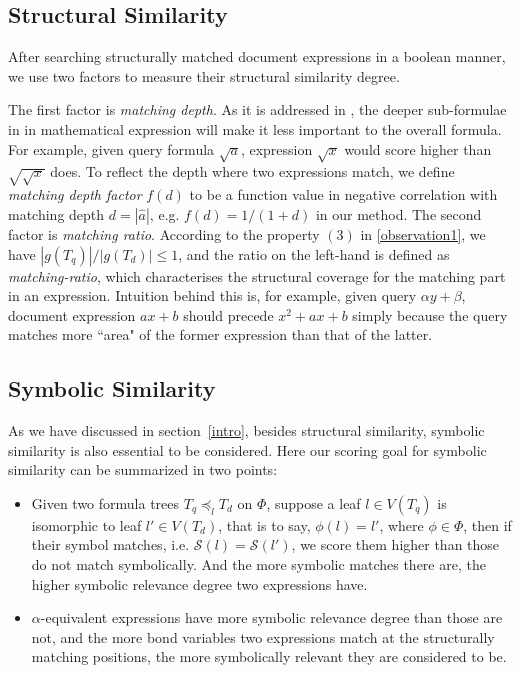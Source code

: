 \documentclass{acm_proc_article-sp}
\begin{document}
\subsection{Structural Similarity}
After searching structurally matched document expressions in a boolean manner, we use two factors to measure their structural similarity degree. 

The first factor is \textit{matching depth}.
As it is addressed in \cite{mias11a}, the deeper sub-formulae in in mathematical expression will make it less important to the overall formula.
For example, given query formula $\sqrt a$, expression $\sqrt {x}$ would score higher than $\sqrt{\sqrt{x}}$ does. 
To reflect the depth where two expressions match, we define \textit{matching depth factor} $f(d)$ to be a function value in negative correlation with matching depth $d = |\hat{a}|$, e.g. $f(d) = 1/(1 + d)$ in our method.
The second factor is \textit{matching ratio}. According to the property $(3)$ in \ref{observation1}, 
we have $|g(T_q)| / |g(T_d)| \le 1$, and the ratio on the left-hand is defined as \textit{matching-ratio}, which characterises the structural coverage for the matching part in an expression.
Intuition behind this is, for example, given query $\alpha y + \beta$, document expression $ax + b$ should precede $x^2 + ax + b$ simply because the query matches more ``area" of the former expression than that of the latter.

\subsection{Symbolic Similarity}
As we have discussed in section~\ref{intro}, besides structural similarity, symbolic similarity is also essential to be considered.
Here our scoring goal for symbolic similarity can be summarized in two points:
\begin{itemize}
\item Given two formula trees
$T_q \preceq_l T_d$ on $\Phi$,  
suppose a leaf $l \in V(T_q)$ is isomorphic to leaf $l' \in V(T_d)$, that is to say, $\phi(l)=l'$, where $\phi \in \Phi$, then if their symbol matches, i.e. $\mathcal{S}(l) = \mathcal{S}(l')$, we score them higher than those do not match symbolically. And the more symbolic matches there are, the higher symbolic relevance degree two expressions have.
\item $\alpha$-equivalent expressions have more symbolic relevance degree than those are not, and the more bond variables two expressions match at the structurally matching positions, the more symbolically relevant they are considered to be.
\end{itemize}
\end{document}
